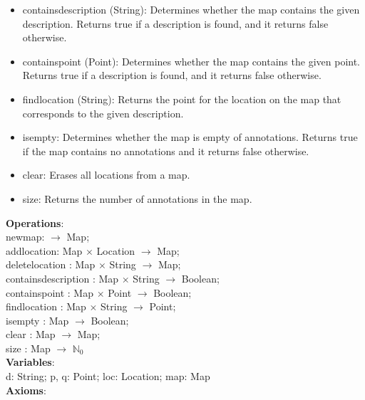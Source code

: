 \documentclass[12pt]{article}
\begin{document}
\begin{spacing}{1.5}
\begin{itemize}
	\item containsdescription (String): Determines whether the map contains the given
	description. Returns true if a description is found, and it returns false otherwise.
	\item containspoint (Point): Determines whether the map contains the given point.
	Returns true if a description is found, and it returns false otherwise.
	\item findlocation (String): Returns the point for the location on the map that corresponds to the given description.
	\item isempty: Determines whether the map is empty of annotations. Returns true if the
	map contains no annotations and it returns false otherwise.
	\item clear: Erases all locations from a map.
	\item size: Returns the number of annotations in the map.	
\end{itemize}
\noindent \textbf{Operations}:\\
\hspace*{5mm} newmap: $\rightarrow$ Map;\\
\hspace*{5mm} addlocation: Map $\times$ Location $\rightarrow$ Map;\\
\hspace*{5mm} deletelocation : Map $\times$ String $\rightarrow$ Map;\\
\hspace*{5mm} containsdescription : Map $\times$ String $\rightarrow$ Boolean;\\
\hspace*{5mm} containspoint : Map $\times$ Point  $\rightarrow$ Boolean;\\
\hspace*{5mm} findlocation : Map $\times$ String  $\rightarrow$ Point;\\
\hspace*{5mm} isempty : Map $\rightarrow$ Boolean;\\
\hspace*{5mm} clear : Map $\rightarrow$ Map;\\
\hspace*{5mm} size : Map $\rightarrow$ $\mathbb{N}_0$ \\
\noindent \textbf{Variables}:\\
\hspace*{5mm} d: String; p, q: Point; loc: Location; map: Map\\
\noindent \textbf{Axioms}:\\

\end{spacing}
\end{document}
